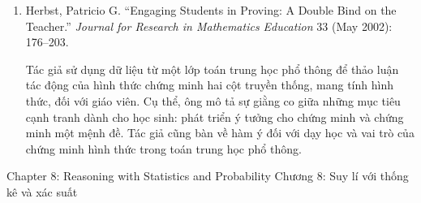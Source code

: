{{\begin{enumerate}
        \item Herbst, Patricio G. ``Engaging Students in Proving: A Double Bind on the Teacher.'' \emph{Journal for Research in Mathematics Education} 33 (May 2002): 176--203.\vspace{.25\baselineskip}

          \par\noindent\hspace*{1em} Tác giả sử dụng dữ liệu từ một lớp toán trung học phổ thông để thảo luận tác động của hình thức chứng minh hai cột truyền thống, mang tính hình thức, đối với giáo viên. Cụ thể, ông mô tả sự giằng co giữa những mục tiêu cạnh tranh dành cho học sinh: phát triển ý tưởng cho chứng minh và chứng minh một mệnh đề. Tác giả cũng bàn về hàm ý đối với dạy học và vai trò của chứng minh hình thức trong toán trung học phổ thông.
      \end{enumerate}}
  }{\NOTE{}}

\ParallelSection
  {Chapter 8: Reasoning with Statistics and Probability}
  {Chương 8: Suy lí với thống kê và xác suất}
  {}

